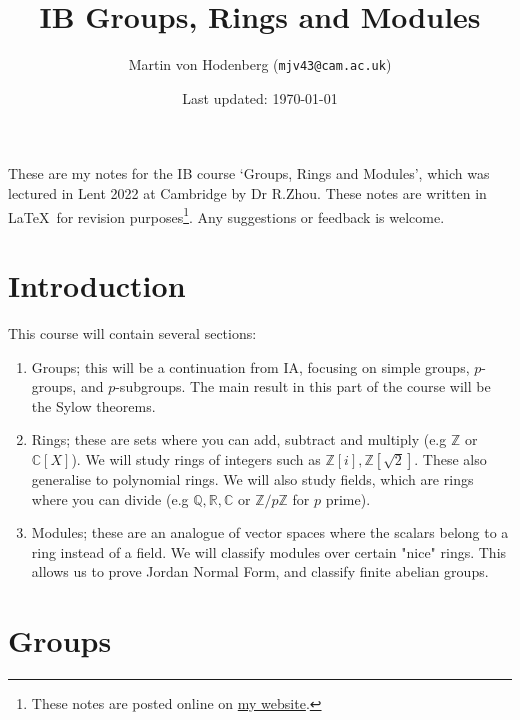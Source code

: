 \documentclass[a4paper]{scrartcl}
\title{IB Groups, Rings and Modules}
\author{Martin von Hodenberg (\texttt{mjv43@cam.ac.uk})}
\date{Last updated: \today}
\begin{document}
\maketitle
These are my notes for the IB course `Groups, Rings and Modules', which was lectured in Lent 2022 at Cambridge by Dr R.Zhou. These notes are written in \LaTeX  \ for revision purposes\footnote{These notes are posted online on \href{https://mjv43.user.srcf.net/}{my website}.}. Any suggestions or feedback is welcome.
\tableofcontents

\newpage
\section{Introduction}
This course will contain several sections: 
\begin{enumerate}
    \item Groups; this will be a continuation from IA, focusing on simple groups, $p$-groups, and $p$-subgroups. The main result in this part of the course will be the Sylow theorems.
    \item Rings; these are sets where you can add, subtract and multiply (e.g $\mathbb{Z}$ or $\mathbb{C}[X]$). We will study rings of integers such as $\mathbb{Z}[i], \mathbb{Z}[\sqrt{2}]$. These also generalise to polynomial rings. We will also study fields, which are rings where you can divide (e.g $\mathbb{Q},\mathbb{R},\mathbb{C}$ or $\mathbb{Z}/p\mathbb{Z}$ for $p$ prime).
    \item Modules; these are an analogue of vector spaces where the scalars belong to a ring instead of a field. We will classify modules over certain "nice" rings. This allows us to prove Jordan Normal Form, and classify finite abelian groups. 
\end{enumerate}
\section{Groups}
\end{document}
